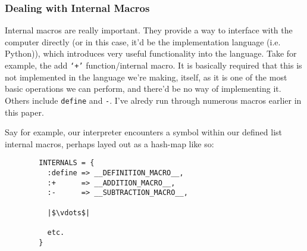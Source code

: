 \documentclass{article}
\newcommand{\code}[1]{\texttt{#1}}
\begin{document}
    \subsubsection{Dealing with Internal Macros}
      Internal macros are really important. They provide a way to interface with
      the computer directly (or in this case, it'd be the implementation
      language (i.e. Python)), which introduces very useful functionality into
      the language. Take for example, the add \code{`+'} function/internal macro.
      It is basically required that this is not implemented in the language we're
      making, itself, as it is one of the most basic operations we can perform,
      and there'd be no way of implementing it. Others include \code{define} and
      \code{-}. I've alredy run through numerous macros earlier in this paper.

      Say for example, our interpreter encounters a symbol within our defined
      list internal macros, perhaps layed out as a hash-map like so:
      \begin{verbatim}
        INTERNALS = {
          :define => __DEFINITION_MACRO__,
          :+      => __ADDITION_MACRO__,
          :-      => __SUBTRACTION_MACRO__,

          |$\vdots$|

          etc.
        }
      \end{verbatim}
\end{document}
